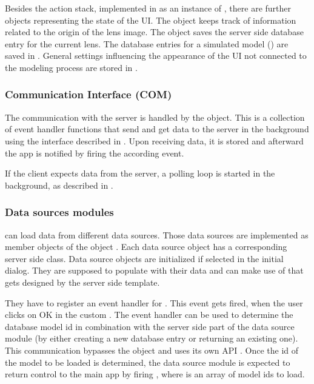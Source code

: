 

Besides the action stack, implemented in  as an instance of , there are further objects representing the state of the UI.
The object  keeps track of information related to the origin of the lens image.
The object  saves the server side database entry for the current lens.
The database entries for a simulated model () are saved in .
General settings influencing the appearance of the UI not connected to the modeling process are stored in .




\subsubsection{Communication Interface (COM)}
The communication with the server is handled by the  object.
This is a collection of event handler functions that send and get data to the server in the background using the interface described in .
Upon receiving data, it is stored and afterward the app is notified by firing the according event.

If the client expects data from the server, a polling loop is started in the background, as described in .


\subsubsection{Data sources modules}

\spl can load data from different data sources.
Those data sources are implemented as member objects of the object .
Each data source object has a corresponding server side class.
Data source objects are initialized if selected in the initial dialog.
They are supposed to populate  with their data and can make use of  that gets designed by the server side template.

They have to register an event handler for .
This event gets fired, when the user clicks on OK in the custom .
The event handler can be used to determine the database model id in combination with the server side part of the data source module (by either creating a new database entry or returning an existing one). This communication bypasses the  object and uses its own API .
Once the id of the model to be loaded is determined, the data source module is expected to return control to the main app by firing , where  is an array of model ids to load.

